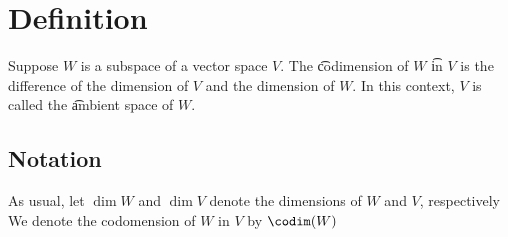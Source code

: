 

\section*{Definition}

Suppose $W$ is a subspace of a vector space $V$.
The \t{codimension} of $W$ \t{in} $V$ is the difference of the dimension of $V$ and the dimension of $W$.
In this context, $V$ is called the \t{ambient space} of $W$.

\subsection*{Notation}

As usual, let $\dim W$ and $\dim V$ denote the dimensions of $W$ and $V$, respectively
We denote the codomension of $W$ in $V$ by $\codim(W)$

\blankpage
